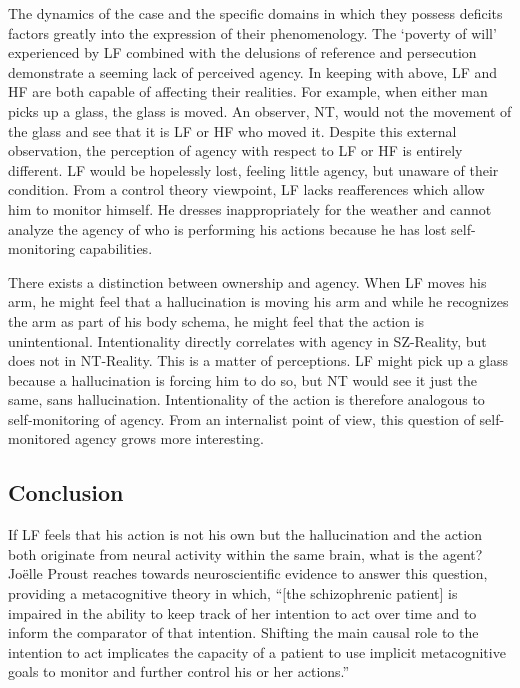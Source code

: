 \documentclass[]{article}
\begin{document}
		The dynamics of the case and the specific domains in which they possess deficits factors greatly into the expression of their phenomenology. The ‘poverty of will’ experienced by LF combined with the delusions of reference and persecution demonstrate a seeming lack of perceived agency. In keeping with above, LF and HF are both capable of affecting their realities. For example, when either man picks up a glass, the glass is moved. An observer, NT, would not the movement of the glass and see that it is LF or HF who moved it. Despite this external observation, the perception of agency with respect to LF or HF is entirely different. LF would be hopelessly lost, feeling little agency, but unaware of their condition. From a control theory viewpoint, LF lacks reafferences which allow him to monitor himself. He dresses inappropriately for the weather and cannot analyze the agency of who is performing his actions because he has lost self-monitoring capabilities.
		
		There exists a distinction between ownership and agency. When LF moves his arm, he might feel that a hallucination is moving his arm and while he recognizes the arm as part of his body schema, he might feel that the action is unintentional. Intentionality directly correlates with agency in SZ-Reality, but does not in NT-Reality. This is a matter of perceptions. LF might pick up a glass because a hallucination is forcing him to do so, but NT would see it just the same, sans hallucination. Intentionality of the action is therefore analogous to self-monitoring of agency. From an internalist point of view, this question of self-monitored agency grows more interesting.
		
	\subsection{Conclusion}
		
		If LF feels that his action is not his own but the hallucination and the action both originate from neural activity within the same brain, what is the agent? Joëlle Proust reaches towards neuroscientific evidence to answer this question, providing a metacognitive theory in which, “[the schizophrenic patient] is impaired in the ability to keep track of her intention to act over time and to inform the comparator of that intention. Shifting the main causal role to the intention to act implicates the capacity of a patient to use implicit metacognitive goals to monitor and further control his or her actions.” 
		
\end{document}
